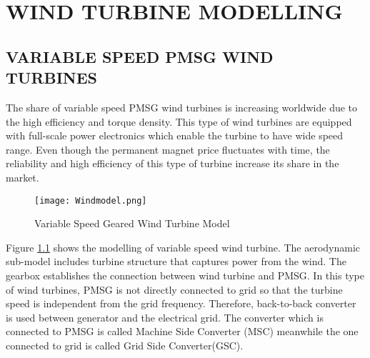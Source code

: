\chapter{WIND TURBINE MODELLING}
\label{chp:3}

\section{VARIABLE SPEED PMSG WIND TURBINES}

The share of variable speed PMSG wind turbines is increasing worldwide due to the high efficiency and torque density. This type of wind turbines are equipped with full-scale power electronics which enable the turbine to have wide speed range. Even though the permanent magnet price fluctuates with time, the reliability and high efficiency of this type of turbine increase its share in the market.

 \begin{figure}[h!]
	\centering
	\texttt{[image: Windmodel.png]}
	\caption{Variable Speed Geared Wind Turbine Model}
	\label{varspeedpmsg}
\end{figure} 

Figure \ref{varspeedpmsg} shows the modelling of variable speed wind turbine. The aerodynamic sub-model includes turbine structure that captures power from the wind. The gearbox establishes the connection between wind turbine and PMSG. In this type of wind turbines, PMSG is not directly connected to grid so that the turbine speed is independent from the grid frequency. Therefore, back-to-back converter is used between generator and the electrical grid. The converter which is connected to PMSG is called Machine Side Converter (MSC) meanwhile the one connected to grid is called Grid Side Converter(GSC).

